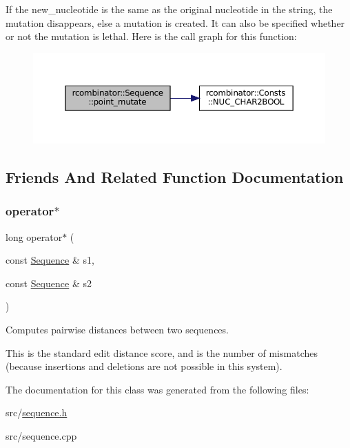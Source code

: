 If the new\+\_\+nucleotide is the same as the original nucleotide in the string, the mutation disappears, else a mutation is created. It can also be specified whether or not the mutation is lethal. Here is the call graph for this function\+:
\nopagebreak
\begin{figure}[H]
\begin{center}
\leavevmode
\includegraphics[width=350pt]{classrcombinator_1_1Sequence_a5f7bccd4725bb8c46f6b93bd01a6b2f0_cgraph}
\end{center}
\end{figure}


\subsection{Friends And Related Function Documentation}
\mbox{\label{classrcombinator_1_1Sequence_abdc71a8f6617dcb6ab73f0e07eb63b67}} 
\subsubsection{\texorpdfstring{operator$\ast$}{operator*}}
{\footnotesize\ttfamily long operator$\ast$ (\begin{DoxyParamCaption}\item[{const \mbox{\hyperlink{classrcombinator_1_1Sequence}{Sequence}} \&}]{s1,  }\item[{const \mbox{\hyperlink{classrcombinator_1_1Sequence}{Sequence}} \&}]{s2 }\end{DoxyParamCaption})\hspace{0.3cm}{\ttfamily [friend]}}



Computes pairwise distances between two sequences. 

This is the standard edit distance score, and is the number of mismatches (because insertions and deletions are not possible in this system). 

The documentation for this class was generated from the following files\+:\begin{DoxyCompactItemize}
\item 
src/\mbox{\hyperlink{sequence_8h}{sequence.\+h}}\item 
src/sequence.\+cpp\end{DoxyCompactItemize}

